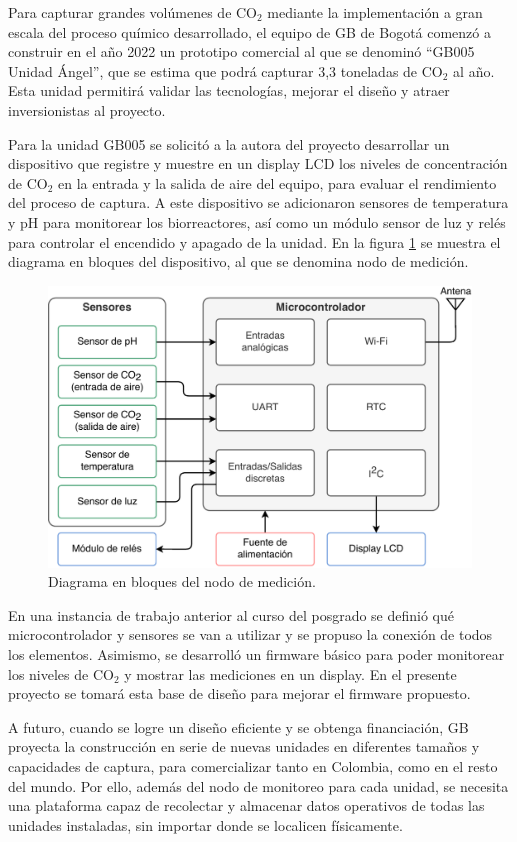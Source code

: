 \documentclass[
11pt, %
]{charter}
\begin{document}
Para capturar grandes volúmenes de CO$_2$ mediante la implementación a gran escala del proceso químico desarrollado, el equipo de GB de Bogotá comenzó a construir en el año 2022 un prototipo comercial al que se denominó “GB005 Unidad Ángel”, que se estima que podrá capturar 3,3 toneladas de CO$_2$ al año. Esta unidad permitirá validar las tecnologías, mejorar el diseño y atraer inversionistas al proyecto.

Para la unidad GB005 se solicitó a la autora del proyecto desarrollar un dispositivo que registre y muestre en un display LCD los niveles de concentración de CO$_2$ en la entrada y la salida de aire del equipo, para evaluar el rendimiento del proceso de captura. 
A este dispositivo se adicionaron sensores de temperatura y pH para monitorear los biorreactores, así como un módulo sensor de luz y relés para controlar el encendido y apagado de la unidad. En la figura \ref{fig:diagNodo} se muestra el diagrama en bloques del dispositivo, al que se denomina nodo de medición. 

\begin{figure}[htpb]
\centering 
\includegraphics[width=.65\textwidth]{./Figuras/dgNodo.pdf}
\caption{Diagrama en bloques del nodo de medición.}
\label{fig:diagNodo}
\end{figure}

En una instancia de trabajo anterior al curso del posgrado se definió qué microcontrolador y sensores se van a utilizar y se propuso la conexión de todos los elementos. Asimismo, se desarrolló un firmware básico para poder monitorear los niveles de CO$_2$ y mostrar las mediciones en un display. En el presente proyecto se tomará esta base de diseño para mejorar el firmware propuesto.

A futuro, cuando se logre un diseño eficiente y se obtenga financiación, GB proyecta la construcción en serie de nuevas unidades en diferentes tamaños y capacidades de captura, para comercializar tanto en Colombia, como en el resto del mundo. Por ello, además del nodo de monitoreo para cada unidad, se necesita una plataforma capaz de recolectar y almacenar datos operativos de todas las unidades instaladas, sin importar donde se localicen físicamente.
\end{document}
